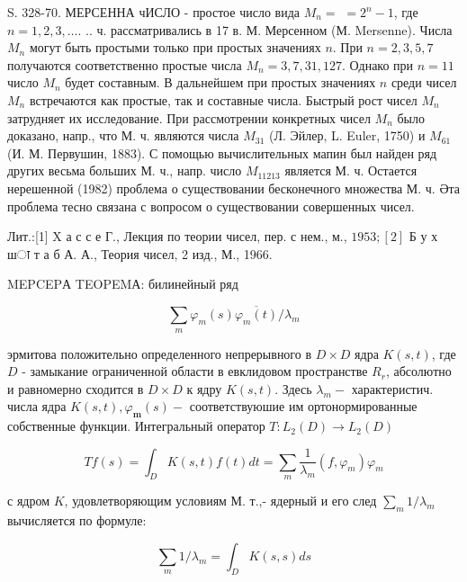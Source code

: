 \documentclass[10pt]{article}
\begin{document}
S. 328-70. МЕРСЕННА чИСЛО - простое число вида $M_{n}=$ $=2^{n}-1$, где $n=1,2,3, \ldots$. .. ч. рассматривались в 17 в. М. Мерсенном (М. Mersenne). Числа $M_{n}$ могут быть простыми только при простых значениях $n$. При $n=2,3,5,7$ получаются соответственно простые числа $M_{n}=3,7,31,127$. Однако при $n=11$ число $M_{n}$ будет составным. В дальнейшем при простых значениях $n$ среди чисел $M_{n}$ встречаются как простые, так и составные числа. Быстрый рост чисел $M_{n}$ затрудняет их исследование. При рассмотрении конкретных чисел $M_{n}$ было доказано, напр., что М. ч. являются числа $M_{31}$ (Л. Эйлер, L. Euler, 1750) и $M_{61}$ (И. М. Первушин, 1883). С помощью вычислительных мапин был найден ряд других весьма больших М. ч., напр. число $M_{11213}$ является М. ч. Остается нерешенной (1982) проблема о существовании бесконечного множества М. ч. Әта проблема тесно связана с вопросом о существовании совершенных чисел.



Лит.:[1] X а с с е Г., Лекция по теории чисел, пер. с нем., м., $1953 ;[2]$ Б у х шा т а б А. А., Теория чисел, 2 изд., М., 1966.



MEPCEPА TEOPEMА: билинейный ряд



\[

\sum_{m} \varphi_{m}(s) \overline{\varphi_{m}(t)} / \lambda_{m}

\]



эрмитова положительно определенного непрерывного в $D \times D$ ядра $K(s, t)$, где $D$ - замыкание ограниченной области в евклидовом пространстве $R_{r}$, абсолютно и равномерно сходится в $D \times D$ к ядру $K(s, t)$. Здесь $\lambda_{m}-$ характеристич. числа ядра $K(s, t), \varphi_{\boldsymbol{m}}(s)-$ соответствуюшие им ортонормированные собственные функции. Интегральный оператор $T: L_{2}(D) \rightarrow L_{2}(D)$



\[

T f(s)=\int_{D} K(s, t) f(t) d t=\sum_{m} \frac{1}{\lambda_{m}}\left(f, \varphi_{m}\right) \varphi_{m}

\]



с ядром $K$, удовлетворяющим условиям М. т.,- ядерный и его след $\sum_{m} 1 / \lambda_{m}$ вычисляется по формуле:



\[

\sum_{m} 1 / \lambda_{m}=\int_{D} K(s, s) d s

\]
\end{document}
